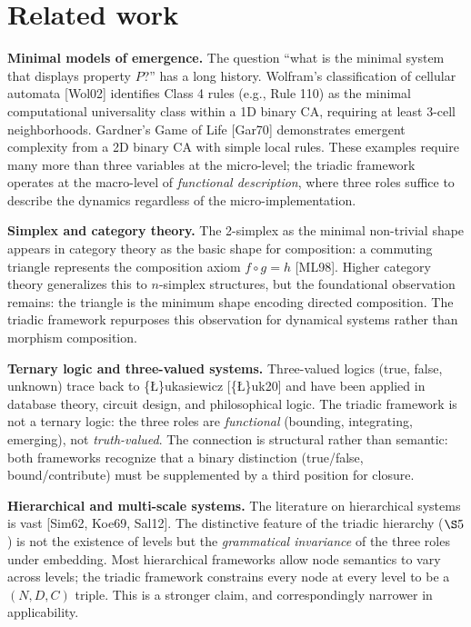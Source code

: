 \documentclass[12pt]{article}
\begin{document}
\section{Related work}\label{related-work}

\textbf{Minimal models of emergence.} The question ``what is the minimal
system that displays property \(P\)?'' has a long history. Wolfram's
classification of cellular automata {[}Wol02{]} identifies Class 4 rules
(e.g., Rule 110) as the minimal computational universality class within
a 1D binary CA, requiring at least 3-cell neighborhoods. Gardner's Game
of Life {[}Gar70{]} demonstrates emergent complexity from a 2D binary CA
with simple local rules. These examples require many more than three
variables at the micro-level; the triadic framework operates at the
macro-level of \emph{functional description}, where three roles suffice
to describe the dynamics regardless of the micro-implementation.

\textbf{Simplex and category theory.} The 2-simplex as the minimal
non-trivial shape appears in category theory as the basic shape for
composition: a commuting triangle represents the composition axiom
\(f \circ g = h\) {[}ML98{]}. Higher category theory generalizes this to
\(n\)-simplex structures, but the foundational observation remains: the
triangle is the minimum shape encoding directed composition. The triadic
framework repurposes this observation for dynamical systems rather than
morphism composition.

\textbf{Ternary logic and three-valued systems.} Three-valued logics
(true, false, unknown) trace back to \{\L\}ukasiewicz {[}\{\L\}uk20{]}
and have been applied in database theory, circuit design, and
philosophical logic. The triadic framework is not a ternary logic: the
three roles are \emph{functional} (bounding, integrating, emerging), not
\emph{truth-valued}. The connection is structural rather than semantic:
both frameworks recognize that a binary distinction (true/false,
bound/contribute) must be supplemented by a third position for closure.

\textbf{Hierarchical and multi-scale systems.} The literature on
hierarchical systems is vast {[}Sim62, Koe69, Sal12{]}. The distinctive
feature of the triadic hierarchy (\(\S 5\)) is not the existence of
levels but the \emph{grammatical invariance} of the three roles under
embedding. Most hierarchical frameworks allow node semantics to vary
across levels; the triadic framework constrains every node at every
level to be a \((N, D, C)\) triple. This is a stronger claim, and
correspondingly narrower in applicability.
\end{document}
